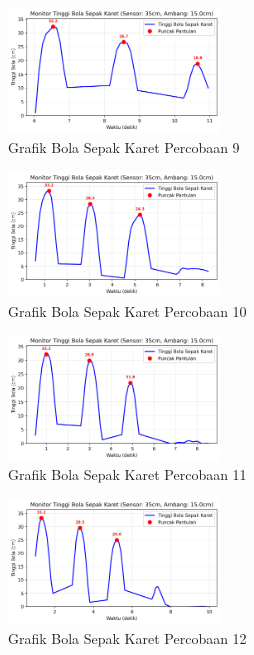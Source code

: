 \begin{figure}[htbp]
    \centering
    \includegraphics[width=0.5\textwidth]{chapters/DataPercobaan/Grafik_Bola_Sepak_Karet_9.png}
    \caption{Grafik Bola Sepak Karet Percobaan 9}
\end{figure}
\begin{figure}[htbp]
    \centering
    \includegraphics[width=0.5\textwidth]{chapters/DataPercobaan/Grafik_Bola_Sepak_Karet_10.png}
    \caption{Grafik Bola Sepak Karet Percobaan 10}
\end{figure}
\begin{figure}[htbp]
    \centering
    \includegraphics[width=0.5\textwidth]{chapters/DataPercobaan/Grafik_Bola_Sepak_Karet_11.png}
    \caption{Grafik Bola Sepak Karet Percobaan 11}
\end{figure}
\begin{figure}[htbp]
    \centering
    \includegraphics[width=0.5\textwidth]{chapters/DataPercobaan/Grafik_Bola_Sepak_Karet_12.png}
    \caption{Grafik Bola Sepak Karet Percobaan 12}
\end{figure}
